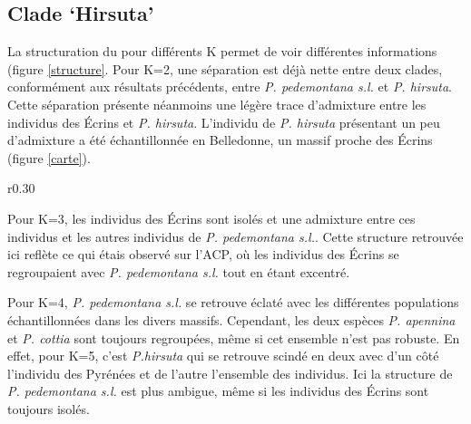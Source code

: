 
\subsection{Clade `Hirsuta'}

La structuration du  pour différents K permet de voir différentes informations (figure \ref{structure}. Pour K=2, une séparation est déjà nette entre deux clades, conformément aux résultats précédents, entre \textit{P. pedemontana s.l.} et \textit{P. hirsuta}. Cette séparation présente néanmoins une légère trace d'admixture entre les individus des Écrins et \textit{P. hirsuta}. L'individu de \textit{P. hirsuta} présentant un peu d'admixture a été échantillonnée en Belledonne, un massif proche des Écrins (figure \ref{carte}).

\begin{wrapfigure}{r}{0.30\textwidth}
	\vspace{-40pt}
	\begin{center}
	\end{center}
	\vspace{-20pt}
	\caption{\textbf{structure} snmf pour k de 2 a 5}
    \label{structure}
\end{wrapfigure}

Pour K=3, les individus des Écrins sont isolés et une admixture entre ces individus et les autres individus de \textit{P. pedemontana s.l.}. Cette structure retrouvée ici reflète ce qui étais observé sur l'ACP, où les individus des Écrins se regroupaient avec \textit{P. pedemontana s.l.} tout en étant excentré.

Pour K=4, \textit{P. pedemontana s.l.} se retrouve éclaté avec les différentes populations échantillonnées dans les divers massifs. Cependant, les deux espèces \textit{P. apennina} et \textit{P. cottia} sont toujours regroupées, même si cet ensemble n'est pas robuste. En effet, pour K=5, c'est \textit{P.hirsuta} qui se retrouve scindé en deux avec d'un côté l'individu des Pyrénées et de l'autre l'ensemble des individus. Ici la structure de \textit{P. pedemontana s.l.} est plus ambigue, même si les individus des Écrins sont toujours isolés.


